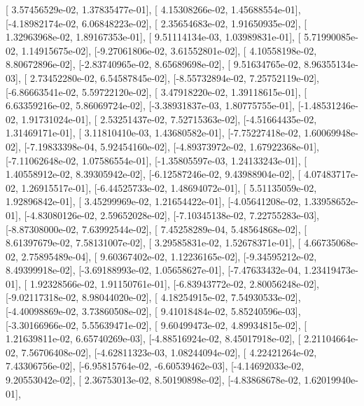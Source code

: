 \documentclass{article}
\begin{document}
       [ 3.57456529e-02,  1.37835477e-01],
       [ 4.15308266e-02,  1.45688554e-01],
       [-4.18982174e-02,  6.06848223e-02],
       [ 2.35654683e-02,  1.91650935e-02],
       [ 1.32963968e-02,  1.89167353e-01],
       [ 9.51114134e-03,  1.03989831e-01],
       [ 5.71990085e-02,  1.14915675e-02],
       [-9.27061806e-02,  3.61552801e-02],
       [ 4.10558198e-02,  8.80672896e-02],
       [-2.83740965e-02,  8.65689698e-02],
       [ 9.51634765e-02,  8.96355134e-03],
       [ 2.73452280e-02,  6.54587845e-02],
       [-8.55732894e-02,  7.25752119e-02],
       [-6.86663541e-02,  5.59722120e-02],
       [ 3.47918220e-02,  1.39118615e-01],
       [ 6.63359216e-02,  5.86069724e-02],
       [-3.38931837e-03,  1.80775755e-01],
       [-1.48531246e-02,  1.91731024e-01],
       [ 2.53251437e-02,  7.52715363e-02],
       [-4.51664435e-02,  1.31469171e-01],
       [ 3.11810410e-03,  1.43680582e-01],
       [-7.75227418e-02,  1.60069948e-02],
       [-7.19833398e-04,  5.92454160e-02],
       [-4.89373972e-02,  1.67922368e-01],
       [-7.11062648e-02,  1.07586554e-01],
       [-1.35805597e-03,  1.24133243e-01],
       [ 1.40558912e-02,  8.39305942e-02],
       [-6.12587246e-02,  9.43988904e-02],
       [ 4.07483717e-02,  1.26915517e-01],
       [-6.44525733e-02,  1.48694072e-01],
       [ 5.51135059e-02,  1.92896842e-01],
       [ 3.45299969e-02,  1.21654422e-01],
       [-4.05641208e-02,  1.33958652e-01],
       [-4.83080126e-02,  2.59652028e-02],
       [-7.10345138e-02,  7.22755283e-03],
       [-8.87308000e-02,  7.63992544e-02],
       [ 7.45258289e-04,  5.48564868e-02],
       [ 8.61397679e-02,  7.58131007e-02],
       [ 3.29585831e-02,  1.52678371e-01],
       [ 4.66735068e-02,  2.75895489e-04],
       [ 9.60367402e-02,  1.12236165e-02],
       [-9.34595212e-02,  8.49399918e-02],
       [-3.69188993e-02,  1.05658627e-01],
       [-7.47633432e-04,  1.23419473e-01],
       [ 1.92328566e-02,  1.91150761e-01],
       [-6.83943772e-02,  2.80056248e-02],
       [-9.02117318e-02,  8.98044020e-02],
       [ 4.18254915e-02,  7.54930533e-02],
       [-4.40098869e-02,  3.73860508e-02],
       [ 9.41018484e-02,  5.85240596e-03],
       [-3.30166966e-02,  5.55639471e-02],
       [ 9.60499473e-02,  4.89934815e-02],
       [ 1.21639811e-02,  6.65740269e-03],
       [-4.88516924e-02,  8.45017918e-02],
       [ 2.21104664e-02,  7.56706408e-02],
       [-4.62811323e-03,  1.08244094e-02],
       [ 4.22421264e-02,  7.43306756e-02],
       [-6.95815764e-02, -6.60539462e-03],
       [-4.14692033e-02,  9.20553042e-02],
       [ 2.36753013e-02,  8.50190898e-02],
       [-4.83868678e-02,  1.62019940e-01],
\end{document}
